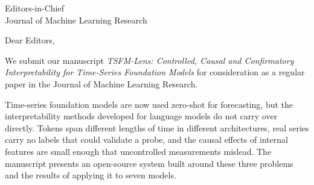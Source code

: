 \documentclass[11pt]{letter}
\date{October 14, 2026}
\begin{document}
\begin{letter}{Editors-in-Chief\\Journal of Machine Learning Research}

\opening{Dear Editors,}

We submit our manuscript \emph{TSFM-Lens: Controlled, Causal and Confirmatory Interpretability for Time-Series
Foundation Models} for consideration as a regular paper in the Journal of Machine Learning Research.

Time-series foundation models are now used zero-shot for forecasting, but the interpretability methods developed for
language models do not carry over directly. Tokens span different lengths of time in different architectures, real
series carry no labels that could validate a probe, and the causal effects of internal features are small enough that
uncontrolled measurements mislead. The manuscript presents an open-source system built
around these three problems and the results of applying it to seven models.


\end{letter}
\end{document}
